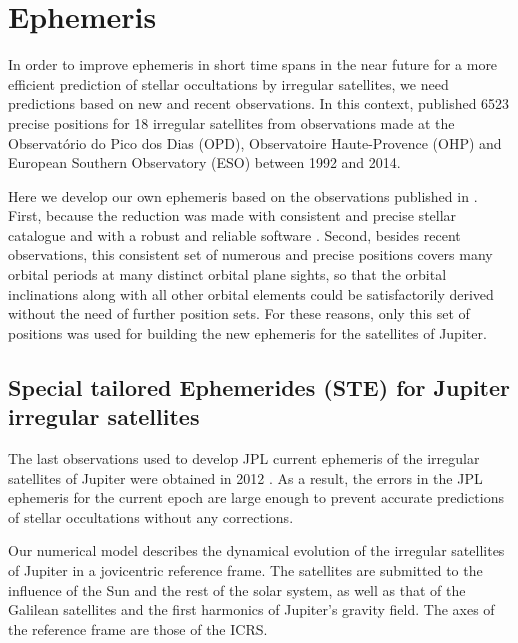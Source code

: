 \documentclass[useAMS,usenatbib]{mn2e}
\begin{document}
\section{Ephemeris} \label{Sec: integration}

In order to improve ephemeris in short time spans in the near future for a more efficient prediction of stellar occultations by irregular satellites, we need predictions based on new and recent observations. In this context, \cite{GomesJunior2015} published 6523 precise positions for 18 irregular satellites from observations made at the Observatório do Pico dos Dias (OPD), Observatoire Haute-Provence (OHP) and European Southern Observatory (ESO) between 1992 and 2014. 

Here we develop our own ephemeris based on the observations published in \cite{GomesJunior2015}. First, because the reduction was made with consistent and precise stellar catalogue and with a robust and reliable software \citep[PRAIA,][]{Assafin2011}. Second, besides recent observations, this consistent set of numerous and precise positions covers many orbital periods at many distinct orbital plane sights, so that the orbital inclinations along with all other orbital elements could be satisfactorily derived without the need of further position sets. For these reasons, only this set of positions was used for building the new ephemeris for the satellites of Jupiter.

\subsection{Special tailored Ephemerides (STE) for Jupiter irregular satellites}

The last observations used to develop JPL current ephemeris of the irregular satellites of Jupiter were obtained in 2012 \citep{Jacobson2012}. As a result, the errors in the JPL ephemeris for the current epoch are large enough to prevent accurate predictions of stellar occultations without any corrections.

Our numerical model describes the dynamical evolution of the irregular satellites of Jupiter in a jovicentric reference frame. The satellites are submitted to the influence of the Sun and the rest of the solar system, as well as that of the Galilean satellites and the first harmonics of Jupiter's gravity field. The axes of the reference frame are those of the ICRS. 
\end{document}
